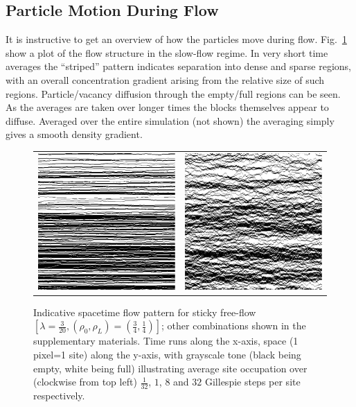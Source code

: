 \documentclass[
reprint, amsmath,amssymb,
]{revtex4-1}
\begin{document}
\subsection{Particle Motion During Flow}
It is instructive to get an overview of how the particles move during
flow. Fig.~\ref{fig:flowPatterns} show a plot of the flow structure in
the slow-flow regime.  In very short time averages the ``striped''
pattern indicates separation into dense and sparse regions, with an
overall concentration gradient arising from the relative size of such
regions.  Particle/vacancy diffusion through the empty/full regions
can be seen.  As the averages are taken over longer times the blocks themselves appear to diffuse.  Averaged over the entire simulation (not shown) the averaging simply gives a smooth density gradient.

\begin{figure}[h!]
\caption{\label{fig:flowPatterns} 
Indicative spacetime flow pattern for sticky free-flow $\left[\lambda = \frac{3}{20}, (\rho_0, \rho_L) = (\frac{3}{4}, \frac{1}{4})\right]$; other combinations shown in the supplementary materials.
Time runs along the x-axis, space (1 pixel=1 site) along the y-axis, with grayscale tone (black being empty, white being full) illustrating average site occupation over (clockwise from top left) $\frac{1}{32}$, $1$, $8$ and $32$ Gillespie steps per site respectively.}
\begin{center}
 \begin{tabular}{c | c}
    \includegraphics[width=0.49\linewidth]{shortTime}  &\includegraphics[width=0.49\linewidth]{midShortTime} \\

\end{tabular}
\end{center}
\end{figure}
\end{document}
